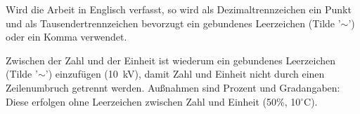 Wird die Arbeit in Englisch verfasst, so wird als Dezimaltrennzeichen ein Punkt und als Tausendertrennzeichen bevorzugt ein gebundenes Leerzeichen (Tilde  '$\sim$') oder ein Komma verwendet.

Zwischen der Zahl und der Einheit ist wiederum ein gebundenes Leerzeichen (Tilde '$\sim$') einzufügen (10~kV), damit Zahl und Einheit nicht durch einen Zeilenumbruch getrennt werden. Außnahmen sind Prozent und Gradangaben: Diese erfolgen ohne Leerzeichen zwischen Zahl und Einheit (50\%, 10$^\circ$C).
